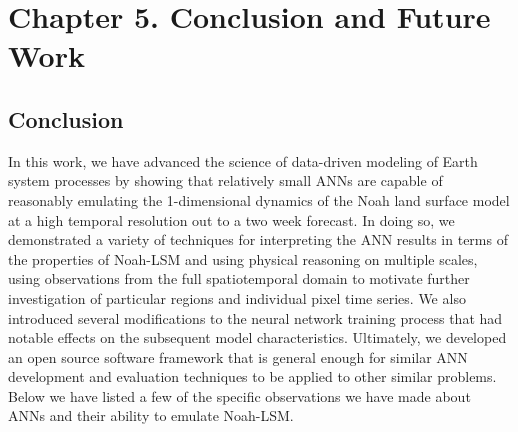 \chapter{Chapter 5. Conclusion and Future Work}

\section{Conclusion}

In this work, we have advanced the science of data-driven modeling of Earth system processes by showing that relatively small ANNs are capable of reasonably emulating the 1-dimensional dynamics of the Noah land surface model at a high temporal resolution out to a two week forecast. In doing so, we demonstrated a variety of techniques for interpreting the ANN results in terms of the properties of Noah-LSM and using physical reasoning on multiple scales, using observations from the full spatiotemporal domain to motivate further investigation of particular regions and individual pixel time series. We also introduced several modifications to the neural network training process that had notable effects on the subsequent model characteristics. Ultimately, we developed an open source software framework that is general enough for similar ANN development and evaluation techniques to be applied to other similar problems. Below we have listed a few of the specific observations we have made about ANNs and their ability to emulate Noah-LSM.

